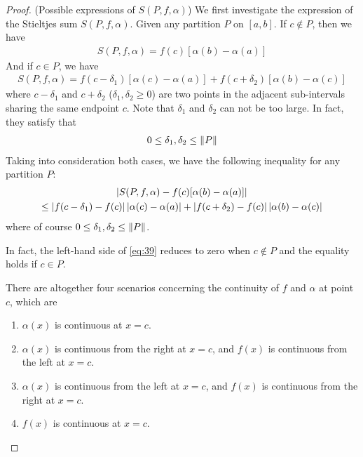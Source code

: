 \documentclass[thmcnt=section, 12pt]{my-elegantbook}
\begin{document}
\begin{proof}
    (Possible expressions of $S(P,f,\alpha)$) We first investigate the expression of the Stieltjes sum $S(P,f,\alpha)$. Given any partition $P$ on $[a, b]$. If $c \notin P$, then we have
    \begin{align*}
        S(P,f,\alpha) = f(c) [\alpha(b) - \alpha(a)]
    \end{align*}
    And if $c \in P$, we have
    \begin{align*}
        S(P,f,\alpha)
        = f(c-\delta_1) [\alpha(c) - \alpha(a)]
        + f(c+\delta_2) [\alpha(b) - \alpha(c)]
    \end{align*}
    where $c-\delta_1$ and $c+\delta_2$ ($\delta_1, \delta_2 \geq 0$) are two points in the adjacent sub-intervals sharing the same endpoint $c$. Note that $\delta_1$ and $\delta_2$ can not be too large. In fact, they satisfy that
    \begin{align*}
        0 \leq \delta_1, \delta_2 \leq \left\lVert P \right\rVert
    \end{align*}
    Taking into consideration both cases, we have the following inequality for any partition $P$:
    \begin{multline}
        \left\lvert 
            S(P,f,\alpha)
            - f(c) [\alpha(b) - \alpha(a)]
         \right\rvert \\
        \leq \left\lvert f(c-\delta_1) - f(c) \right\rvert \left\lvert \alpha(c) - \alpha(a) \right\rvert
        + \left\lvert f(c+\delta_2) - f(c) \right\rvert \left\lvert \alpha(b) - \alpha(c) \right\rvert
        \label{eq:39}
    \end{multline}
    where of course $0 \leq \delta_1, \delta_2 \leq \left\lVert P \right\rVert$.

    \begin{note}
        In fact, the left-hand side of \eqref{eq:39} reduces to zero when $c \notin P$ and the equality holds if $c \in P$.
    \end{note}

    \par There are altogether four scenarios concerning the continuity of $f$ and $\alpha$ at point $c$, which are
    \begin{enumerate}
        \item $\alpha(x)$ is continuous at $x=c$.
        \item $\alpha(x)$ is continuous from the right at $x=c$, and $f(x)$ is continuous from the left at $x=c$.
        \item $\alpha(x)$ is continuous from the left at $x=c$, and $f(x)$ is continuous from the right at $x=c$.
        \item $f(x)$ is continuous at $x=c$.
    \end{enumerate}


\end{proof}
\end{document}
